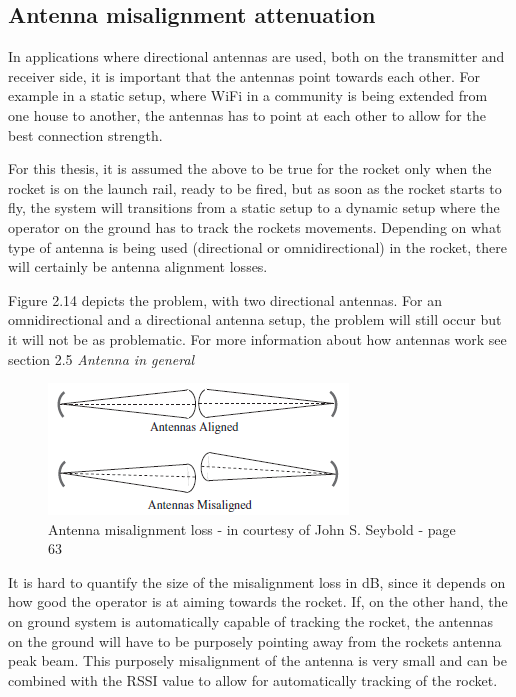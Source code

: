 \subsection{Antenna misalignment attenuation}
In applications where directional antennas are used, both on the transmitter and receiver side, it is important that the antennas point towards each other. For example in a static setup, where WiFi in a community is being extended from one house to another, the antennas has to point at each other to allow for the best connection strength.  

For this thesis, it is assumed the above to be true for the rocket only when the rocket is on the launch rail, ready to be fired, but as soon as the rocket starts to fly, the system will transitions from a static setup to a dynamic setup where the operator on the ground has to track the rockets movements. Depending on what type of antenna is being used (directional or omnidirectional) in the rocket, there will certainly be antenna alignment losses.

Figure 2.14 depicts the problem, with two directional antennas. For an omnidirectional and a directional antenna setup, the problem will still occur but it will not be as problematic. For more information about how antennas work see section 2.5 \textit{Antenna in general}    

\begin{figure}[h]
\centering
\includegraphics[scale=1]{figures/AntennasAlignment.PNG}
\caption{Antenna misalignment loss - in courtesy of John S. Seybold  \cite{RFpropagation} - page 63}
\end{figure}

It is hard to  quantify the size of the misalignment loss in dB, since it depends on how good the operator is at aiming towards the rocket. If, on the other hand, the on ground system is automatically capable of tracking the rocket, the antennas on the ground will have to be purposely pointing away from the rockets antenna peak beam. This purposely misalignment of the antenna is very small and can be combined with the RSSI value to allow for automatically tracking of the rocket. %

